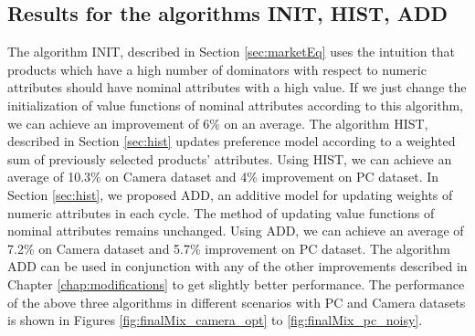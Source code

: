 \subsection{Results for the algorithms INIT, HIST, ADD}
The algorithm INIT, described in Section \ref{sec:marketEq} uses the intuition that products which have a high number of dominators with respect to numeric attributes should have nominal attributes with a high value.
If we just change the initialization of value functions of nominal attributes according to this algorithm, we can achieve an improvement of 6\% on an average.
The algorithm HIST, described in Section \ref{sec:hist} updates preference model according to a weighted sum of previously selected products' attributes.
Using HIST, we can achieve an average of 10.3\% on Camera dataset and 4\% improvement on PC dataset.
In Section \ref{sec:hist}, we proposed ADD, an additive model for  updating weights of numeric attributes in each cycle.
The method of updating value functions of nominal attributes remains unchanged.
Using ADD, we can achieve an average of 7.2\% on Camera dataset and 5.7\% improvement on PC dataset.
The algorithm ADD can be used in conjunction with any of the other improvements described in Chapter \ref{chap:modifications} to get slightly better performance.
The performance of the above three algorithms in different scenarios with PC and Camera datasets is shown in Figures \ref{fig:finalMix_camera_opt} to \ref{fig:finalMix_pc_noisy}.

